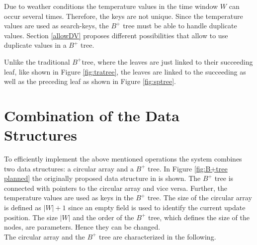 \documentclass[abstracton,12pt]{scrreprt}
\begin{document}
Due to weather conditions the temperature values in the time window $W$ can occur several times. Therefore, the keys are not unique. Since the temperature values are used as search-keys, the $B^+$ tree must be able to handle duplicate values. Section \ref{allowDV} proposes different possibilities that allow to use duplicate values in a $B^+$ tree. 


Unlike the traditional $B^+$tree, where the leaves are just linked to their succeeding leaf, like shown in Figure \ref{fig:tratree}, the leaves are linked to the succeeding as well as the preceding leaf as shown in Figure \ref{fig:sptree}.


\newpage
\section{Combination of the Data Structures}
\label{sec:das}
To efficiently implement the above mentioned operations the system combines two data structures:
a circular array and a $B^+$ tree. In Figure \ref{fig:B+tree planned} the originally proposed data structure in \cite{BScT} is shown. The $B^+$ tree is connected with pointers to the circular array and vice versa. Further, the temperature values are used as keys in the $B^+$ tree. The size of the circular array is defined as $|W| + 1$ since an empty field is used to identify the current update position. The size $|W|$ and the order of the $B^+$ tree, which defines the size of the nodes, are parameters. Hence they can be changed.\\The circular array and the $B^+$ tree are characterized in the following. 
\end{document}
